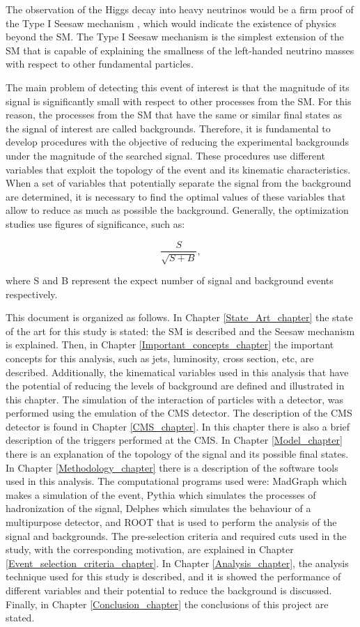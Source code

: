 The observation of the Higgs decay into heavy neutrinos would be a firm proof of the Type I Seesaw mechanism \cite{Type I Seesaw Mechanism}, which would indicate the existence of physics beyond the SM. The Type I Seesaw mechanism is the simplest extension of the SM that is capable of explaining the smallness of the left-handed neutrino masses with respect to other fundamental particles. 

The main problem of detecting this event of interest is that the magnitude of its signal is significantly small with respect to other processes from the SM. For this reason, the processes from the SM that have the same or similar final states as the signal of interest are called backgrounds. Therefore, it is fundamental to develop procedures with the objective of reducing the experimental backgrounds under the magnitude of the searched signal. These procedures use different variables that exploit the topology of the event and its kinematic characteristics. When a set of variables that potentially separate the signal from the background are determined, it is necessary to find the optimal values of these variables that allow to reduce as much as possible the background. Generally, the optimization studies use figures of significance, such as: 

\begin{equation}
    \frac{S}{\sqrt{S+B}},
\end{equation}

where S and B represent the expect number of signal and background events respectively. 

This document is organized as follows. In Chapter \ref{State_Art_chapter} the state of the art for this study is stated: the SM is described and the Seesaw mechanism is explained. Then, in Chapter \ref{Important_concepts_chapter} the important concepts for this analysis, such as 
jets, luminosity, cross section, etc, are described. Additionally, the kinematical variables used in this analysis that have the potential of reducing the levels of background are defined and illustrated in this chapter. The simulation of the interaction of particles with a detector, was performed using the emulation of the CMS detector. The description of the CMS detector is found in Chapter \ref{CMS_chapter}. In this chapter there is also a brief description of the triggers performed at the CMS. In Chapter \ref{Model_chapter} there is an explanation of the topology of the signal and its possible final states. In Chapter \ref{Methodology_chapter} there is a description of the software tools used in this analysis. The computational programs used were: MadGraph which makes a simulation of the event, Pythia which simulates the processes of hadronization of the signal, Delphes which simulates the behaviour of a multipurpose detector, and ROOT that is used to perform the analysis of the signal and backgrounds. The pre-selection criteria and required cuts used in the study, with the corresponding motivation, are explained in Chapter \ref{Event_selection_criteria_chapter}.
In Chapter \ref{Analysis_chapter}, the analysis technique used for this study is described, and it is showed the performance of different variables and their potential to reduce the background is discussed. Finally, in Chapter \ref{Conclusion_chapter} the conclusions of this project are stated. 
